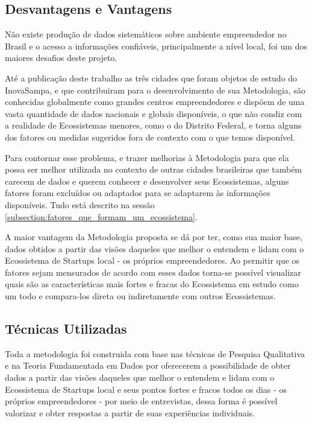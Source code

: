 \subsection{Desvantagens e Vantagens}
\label{subsection:vantagens_e_desvantagens}

Não existe produção de dados sistemáticos sobre ambiente empreendedor no Brasil e o acesso a informações confiáveis, principalmente a nível local, foi um dos maiores desafios deste projeto.

Até a publicação deste trabalho as três cidades que foram objetos de estudo do InovaSampa, e que contribuiram para o desenvolvimento de sua Metodologia, são conhecidas globalmente como grandes centros empreendedores e dispõem de uma vasta quantidade de dados nacionais e globais disponíveis, o que não condiz com a realidade de Ecossistemas menores, como o do Distrito Federal, e torna alguns dos fatores ou medidas sugeridos fora de contexto com o que temos disponível.

Para contornar esse problema, e trazer melhorias à Metodologia para que ela possa ser melhor utilizada no contexto de outras cidades brasileiras que também carecem de dados e querem conhecer e desenvolver seus Ecossistemas, alguns fatores foram excluídos ou adaptados para se adaptarem às informações disponíveis. Tudo está descrito na sessão \ref{subsection:fatores_que_formam_um_ecossistema}.

A maior vantagem da Metodologia proposta se dá por ter, como sua maior base, dados obtidos a partir das visões daqueles que melhor o entendem e lidam com o Ecossistema de Startups local - os próprios empreendedores. Ao permitir que os fatores sejam mensurados de acordo com esses dados torna-se possível visualizar quais são as características mais fortes e fracas do Ecossistema em estudo como um todo e compara-los direta ou indiretamente com outros Ecossistemas.

\subsection{Técnicas Utilizadas}
\label{subsection:tecnicas_utilizadas}

Toda a metodologia foi construida com base nas técnicas de Pesquisa Qualitativa e na Teoria Fundamentada em Dados por oferecerem a possibilidade de obter dados a partir das visões daqueles que melhor o entendem e lidam com o Ecossistema de Startups local e seus pontos fortes e fracos todos os dias - os próprios empreendedores - por meio de entrevistas, dessa forma é possível valorizar e obter respostas a partir de suas experiências individuais.

